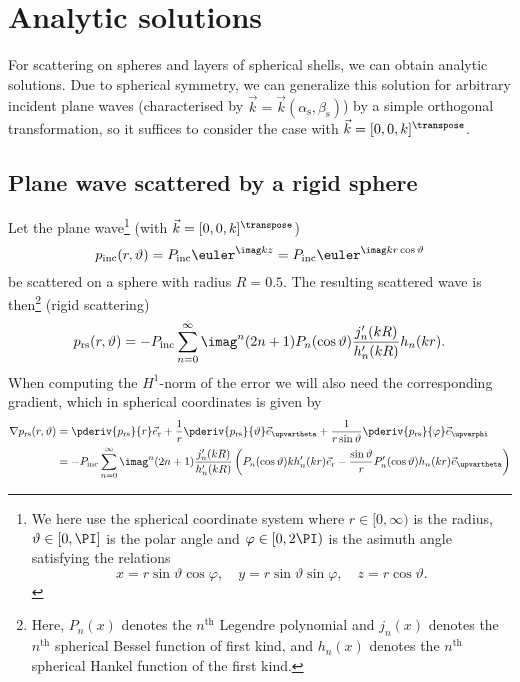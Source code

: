 \section{Analytic solutions}
\label{Sec2:AnalyticSolutions}
For scattering on spheres and layers of spherical shells, we can obtain analytic solutions. Due to spherical symmetry, we can generalize this solution for arbitrary incident plane waves (characterised by $\vec{k}=\vec{k}(\alpha_{\mathrm{s}},\beta_{\mathrm{s}})$) by a simple orthogonal transformation, so it suffices to consider the case with $\vec{k}=[0, 0, k]^\transpose$.

\subsection{Plane wave scattered by a rigid sphere}
Let the plane wave\footnote{We here use the spherical coordinate system where $r\in[0,\infty)$ is the radius, $\vartheta\in[0,\PI]$ is the polar angle and $\varphi\in[0,2\PI)$ is the asimuth angle satisfying the relations
\begin{equation*}
	x = r\sin\vartheta\cos\varphi,\quad y = r\sin\vartheta\sin\varphi,\quad z = r\cos\vartheta.
\end{equation*}
} (with $\vec{k}=[0, 0, k]^\transpose$)
\begin{equation*}
	p_{\textrm{inc}}(r,\vartheta) = P_{\mathrm{inc}}\euler^{\imag kz} = P_{\mathrm{inc}}\euler^{\imag kr\cos\vartheta}
\end{equation*}
be scattered on a sphere with radius $R=0.5$. The resulting scattered wave is then\footnote{Here, $P_n(x)$ denotes the $n^{\mathrm{th}}$ Legendre polynomial and $j_n(x)$ denotes the $n^{\mathrm{th}}$ spherical Bessel function of first kind, and $h_n(x)$ denotes the $n^{\mathrm{th}}$ spherical Hankel function of the first kind.} (rigid scattering)
\begin{equation}\label{Eq2:rigidScattering_p}
	p_{\mathrm{rs}} (r,\vartheta) = -P_{\mathrm{inc}}\sum_{n=0}^\infty \imag^n (2n+1) P_n(\cos\vartheta)\frac{j_n'(kR)}{h_n'(kR)} h_n(kr).
\end{equation}
When computing the $H^1$-norm of the error we will also need the corresponding gradient, which in spherical coordinates is given by
\begin{align*}
	\nabla p_{\mathrm{rs}} (r,\vartheta) &= \pderiv{p_{\mathrm{rs}}}{r}\vec{e}_{\mathrm{r}} + \frac{1}{r}\pderiv{p_{\mathrm{rs}}}{\vartheta}\vec{e}_{\upvartheta} + \frac{1}{r\sin\vartheta}\pderiv{p_{\mathrm{rs}}}{\varphi}\vec{e}_{\upvarphi}\\
	&= -P_{\mathrm{inc}}\sum_{n=0}^\infty \imag^n (2n+1) \frac{j_n'(kR)}{h_n'(kR)} \left(P_n(\cos\vartheta)kh_n'(kr)\vec{e}_{\mathrm{r}} - \frac{\sin\vartheta}{r}P_n'(\cos\vartheta)h_n(kr)\vec{e}_{\upvartheta}\right)
\end{align*}
